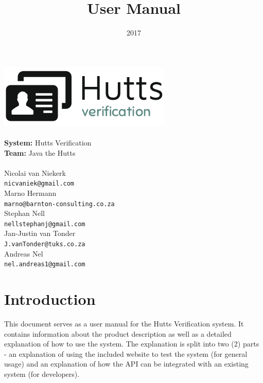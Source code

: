 \documentclass{article}
\title{User Manual}
\date{2017}
\def \system{Hutts Verification}
\begin{document}
\makeatletter
    \begin{titlepage}
        \begin{center}
            {\includegraphics[width=0.7\linewidth]{img/hutts-verification.png}}\\[2ex]
            \vspace{3cm}
            {\huge \bfseries \@title }\\[2ex]
            {\LARGE \textbf{System:} \system}\\[2ex]
            {\LARGE \textbf{Team:} Java the Hutts}\\[2ex]
            {\LARGE \@date}\\[2ex]
            \vspace{3cm}
            {\large  Nicolai van Niekerk\\ \texttt{nicvaniek@gmail.com}}\\[2ex]
            {\large  Marno Hermann\\ \texttt{marno@barnton-consulting.co.za}}\\[2ex]
            {\large  Stephan Nell\\ \texttt{nellstephanj@gmail.com}}\\[2ex]
            {\large  Jan-Justin van Tonder\\ \texttt{J.vanTonder@tuks.co.za}}\\[2ex]
            {\large  Andreas Nel\\ \texttt{nel.andreas1@gmail.com}}\\[2ex]
        \end{center}
        
    \end{titlepage}
\makeatother

\cleardoublepage
\thispagestyle{empty}
\tableofcontents
\newpage

\setcounter{page}{1}
\section{Introduction}
This document serves as a user manual for the {\system} system. It contains information about the product description as well as a detailed explanation of how to use the system. The explanation is split into two (2) parts - an explanation of using the included website to test the system (for general usage) and an explanation of how the API can be integrated with an existing system (for developers).
\end{document}
